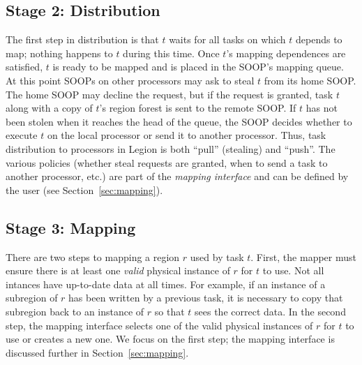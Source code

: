 \subsection{Stage 2: Distribution}
\label{sec:dist}

The first step in distribution is that $t$ waits for all tasks on which $t$ depends to
map; nothing happens to $t$ during this time.  Once $t$'s mapping
dependences are satisfied, $t$ is ready to be mapped and is placed
in the SOOP's mapping queue. At this point SOOPs on other processors may
ask to steal $t$ from its home SOOP.  The home SOOP may decline the
request, but if the request is granted, task $t$ along with a copy of
$t$'s region forest is sent to the remote SOOP.  If $t$ has not been
stolen when it reaches the head of the queue, the SOOP decides whether
to execute $t$ on the local processor or send it to another processor.
Thus, task distribution to processors in Legion is both ``pull'' (stealing) and ``push''.
The various policies (whether steal requests are granted, when to send
a task to another processor, etc.) are part of the {\em mapping interface}
and can be defined by the user (see Section~\ref{sec:mapping}).


\subsection{Stage 3: Mapping}
\label{sec:map}


There are two steps to mapping a region $r$ used by
task $t$.  First, the mapper must ensure there is at least one {\em valid}
physical instance of $r$ for $t$ to use.  Not all intances have up-to-date
data at all times.  For example, if an instance of a subregion of $r$ has been written by a previous task,
it is necessary to copy that subregion back to an instance of $r$ so that $t$
sees the correct data. In the second step, the mapping interface selects one of the
valid physical instances of $r$ for $t$ to use or creates a new one.  
We focus on the first step; the mapping interface is discussed further in Section~\ref{sec:mapping}.

